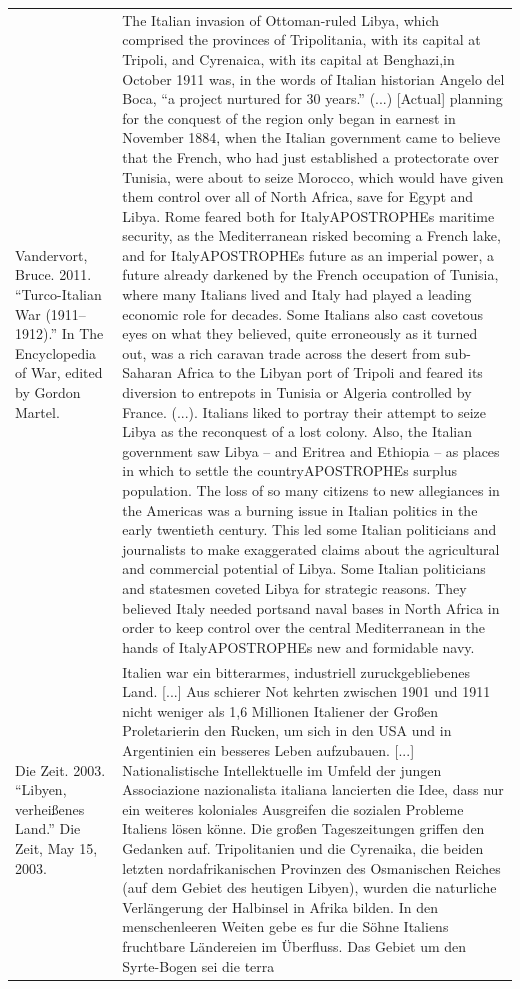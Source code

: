{\begin{longtable}{p{}p{}}
Vandervort, Bruce. 2011. “Turco-Italian War (1911–1912).” In The Encyclopedia of War, edited by Gordon Martel. & The Italian invasion of Ottoman-ruled Libya, which comprised the provinces of Tripolitania, with its capital at Tripoli, and Cyrenaica, with its capital at Benghazi,in October 1911 was, in the words of Italian historian Angelo del Boca, “a project nurtured for 30 years.” (...) [Actual] planning for the conquest of the region only began in earnest in November 1884, when the Italian government came to believe that the French, who had just established a protectorate over Tunisia, were about to seize Morocco, which would have given them control over all of North Africa, save for Egypt and Libya. Rome feared both for ItalyAPOSTROPHEs maritime security, as the Mediterranean risked becoming a French lake, and for ItalyAPOSTROPHEs future as an imperial power, a future already darkened by the French occupation of Tunisia, where many Italians lived and Italy had played a leading economic role for decades. Some Italians also cast covetous eyes on what they believed, quite erroneously as it turned out, was a rich caravan trade across the desert from sub-Saharan Africa to the Libyan port of Tripoli and feared its diversion to entrepots in Tunisia or Algeria controlled by France. (...). Italians liked to portray their attempt to seize Libya as the reconquest of a lost colony. Also, the Italian government saw Libya – and Eritrea and Ethiopia – as places in which to settle the countryAPOSTROPHEs surplus population. The loss of so many citizens to new allegiances in the Americas was a burning issue in Italian politics in the early twentieth century. This led some Italian politicians and journalists to make exaggerated claims about the agricultural and commercial potential of Libya. Some Italian politicians and statesmen coveted Libya for strategic reasons. They believed Italy needed portsand naval bases in North Africa in order to keep control over the central Mediterranean in the hands of ItalyAPOSTROPHEs new and formidable navy.
\\
Die Zeit. 2003. “Libyen, verheißenes Land.” Die Zeit, May 15, 2003. & Italien war ein bitterarmes, industriell zuruckgebliebenes Land. [...] Aus schierer Not kehrten zwischen 1901 und 1911 nicht weniger als 1,6 Millionen Italiener der Großen Proletarierin den Rucken, um sich in den USA und in Argentinien ein besseres Leben aufzubauen. [...] Nationalistische Intellektuelle im Umfeld der jungen Associazione nazionalista italiana lancierten die Idee, dass nur ein weiteres koloniales Ausgreifen die sozialen Probleme Italiens lösen könne. Die großen Tageszeitungen griffen den Gedanken auf. Tripolitanien und die Cyrenaika, die beiden letzten nordafrikanischen Provinzen des Osmanischen Reiches (auf dem Gebiet des heutigen Libyen), wurden die naturliche Verlängerung der Halbinsel in Afrika bilden. In den menschenleeren Weiten gebe es fur die Söhne Italiens fruchtbare Ländereien im Überfluss. Das Gebiet um den Syrte-Bogen sei die terra

\end{longtable}}
